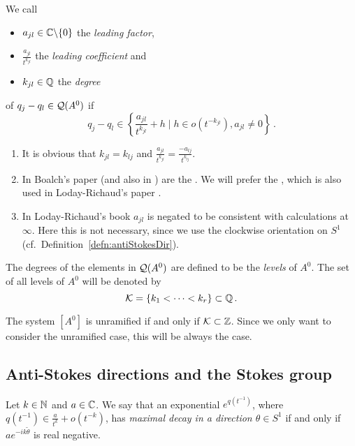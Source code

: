 \begin{defn}\label{defn:determiningPolysOfEndA}
  We call
  \begin{itemize}
    \item $a_{jl}\in\mathbb{C}\backslash\{0\}$ the \emph{leading factor},
    \item $\frac{a_{jl}}{t^{k_{jl}}}$ the \emph{leading
      coefficient} and
    \item $k_{jl}\in\mathbb{Q}$ the \emph{degree}
  \end{itemize}
  of $q_j-q_l\in\mathcal{Q}(A^0)$ if
  \[
    q_j-q_l\in\left\{\frac{a_{jl}}{t^{k_{jl}}}+h \mid h \in o(t^{-k_{jl}}),
      a_{jl}\neq0
    \right\}\,.
  \]
  \begin{s-rem}
    \begin{enumerate}
      \item It is obvious that $k_{jl}=k_{lj}$ and
        $\frac{a_{jl}}{t^{k_{jl}}}=\frac{-a_{lj}}{t^{k_{lj}}}$.
      \item In Boalch's paper \cite{boalch} (and also in \cite{thboalch}) are
        the .
        We will prefer the , which is also used in
        Loday-Richaud's paper \cite{Loday1994}.
      \item In Loday-Richaud's book \cite[Def.4.3.6]{Loday2014} $a_{jl}$ is
        negated to be consistent with calculations at $\infty$.
        Here this is not necessary, since we use the clockwise orientation on
        $S^1$ (cf.\ Definition~\ref{defn:antiStokesDir}).
    \end{enumerate}
  \end{s-rem}
  The degrees of the elements in $\mathcal{Q}(A^0)$ are defined to be  the
  \emph{levels} of $A^0$.
  The set of all levels of $A^0$ will be denoted by
  \[
    \mathcal{K}=\{k_1<\dots<k_r\} \subset \mathbb{Q} \,.
  \]
  \begin{s-rem}
    The system $[A^0]$ is unramified if and only if $\mathcal{K}\subset\mathbb{Z}$.
    Since we only want to consider the unramified case, this will be always the
    case.
  \end{s-rem}
\end{defn}

\pagebreak%
\subsection{Anti-Stokes directions and the Stokes group}
\begin{defn}
  Let $k\in\mathbb{N}$ and $a\in\mathbb{C}$.
  We say that an exponential $e^{q(t^{-1})}$, where
  $q(t^{-1})\in\frac{a}{t^{k}}+o(t^{-k})$, has \emph{maximal decay in a
  direction $\theta\in S^1$} if and only if $ae^{-ik\tilde\theta}$ is real
  negative. 
  \begin{comment}
    $be^0\in\C$ corresponding to has maximal decay if and only if \PROBLEM[$1$
    has maximal decay?]
  \end{comment}
\end{defn}

